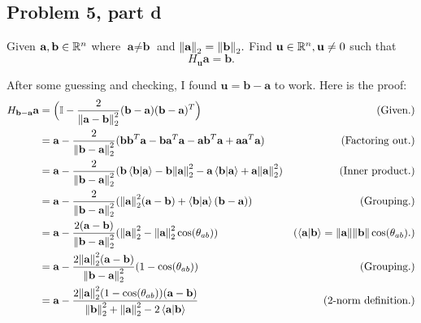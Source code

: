 \newpage
\subsection{Problem 5, part d}
Given $\textbf{a}, \textbf{b} \in \mathbb{R}^n$ where $\textbf{a} \neq \textbf{b}$ and $\norm{\textbf{a}}_2 = \norm{\textbf{b}}_2.$ Find $\textbf{u} \in \mathbb{R}^n, \textbf{u} \neq 0$ such that
\vspace{-5mm}
\[
H_\textbf{u}\textbf{a} = \textbf{b}.
\]
\vspace{-15mm}
\partbreak
\begin{solution}

    After some guessing and checking, I found $\textbf{u} = \textbf{b} - \textbf{a}$ to work. Here is the proof:
{\small
    \alignbreak
    \vspace{-5mm}
    \begin{align*}
        H_{\textbf{b} - \textbf{a}}\textbf{a} &= \Big(\id - \frac{2}{\norm{\textbf{a} - \textbf{b}}_2^2}(\textbf{b} - \textbf{a})(\textbf{b} - \textbf{a})^T\Big) &\text{(Given.)}\\
        &= \textbf{a} - \frac{2}{\norm{\textbf{b} - \textbf{a}}_2^2}(\textbf{b}\textbf{b}^T\textbf{a} - \textbf{b}\textbf{a}^T\textbf{a} - \textbf{a}\textbf{b}^T\textbf{a} + \textbf{a}\textbf{a}^T\textbf{a}) &\text{(Factoring out.)}\\
        &= \textbf{a}- \frac{2}{\norm{\textbf{b} - \textbf{a}}_2^2}(\textbf{b}\braket{\textbf{b}}{\textbf{a}} - \textbf{b}\norm{\textbf{a}}_2^2 - \textbf{a}\braket{\textbf{b}}{\textbf{a}} + \textbf{a}\norm{\textbf{a}}_2^2) &\text{(Inner product.)}\\
        &= \textbf{a}- \frac{2}{\norm{\textbf{b} - \textbf{a}}_2^2}(\norm{\textbf{a}}_2^2 (\textbf{a} - \textbf{b}) + \braket{\textbf{b}}{\textbf{a}}(\textbf{b} - \textbf{a})) &\text{(Grouping.)}\\
        &= \textbf{a}- \frac{2(\textbf{a} - \textbf{b})}{\norm{\textbf{b} - \textbf{a}}_2^2}(\norm{\textbf{a}}_2^2 - \norm{\textbf{a}}_2^2\cos(\theta_{ab})) &(\braket{\textbf{a}}{\textbf{b}} = \norm{\textbf{a}}\norm{\textbf{b}}\cos(\theta_{ab}).)\\
        &= \textbf{a}- \frac{2\norm{\textbf{a}}_2^2(\textbf{a} - \textbf{b})}{\norm{\textbf{b} - \textbf{a}}_2^2}(1 - \cos(\theta_{ab})) &\text{(Grouping.)}\\
        &= \textbf{a}- \frac{2\norm{\textbf{a}}_2^2 (1 - \cos(\theta_{ab}))(\textbf{a} - \textbf{b})}{\norm{\textbf{b}}_2^2 + \norm{\textbf{a}}_2^2 - 2\braket{\textbf{a}}{\textbf{b}}} &\text{(2-norm definition.)}\\

\end{align*}}
\end{solution}
